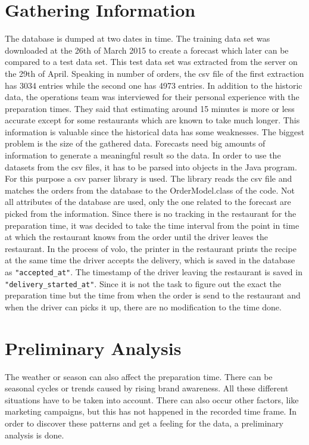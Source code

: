 \section{Gathering Information}\label{section:Gathering Information}
The database is dumped at two dates in time. The training data set was downloaded at the 26th of March 2015 to create a forecast which later can be compared to a test data set. This test data set was extracted from the server on the 29th of April. Speaking in number of orders, the csv file of the first extraction has 3034 entries while the second one has 4973 entries. In addition to the historic data, the operations team was interviewed for their personal experience with the preparation times. They said that estimating around 15 minutes is more or less accurate except for some restaurants which are known to take much longer.\newline
This information is valuable since the historical data has some weaknesses. The biggest problem is the size of the gathered data. Forecasts need big amounts of information to generate a meaningful result so the data.\newline
In order to use the datasets from the csv files, it has to be parsed into objects in the Java program. For this purpose a csv parser library is used. The library reads the csv file and matches the orders from the database to the OrderModel.class of the code. Not all attributes of the database are used, only the one related to the forecast are picked from the information. Since there is no tracking in the restaurant for the preparation time, it was decided to take the time interval from the point in time at which the restaurant knows from the order until the driver leaves the restaurant. In the process of volo, the printer in the restaurant prints the recipe at the same time the driver accepts the delivery, which is saved in the database as \texttt{"accepted\_at"}. The timestamp of the driver leaving the restaurant is saved in \texttt{"delivery\_started\_at"}. Since it is not the task to figure out the exact the preparation time but the time from when the order is send to the restaurant and when the driver can picks it up, there are no modification to the time done.
\section{Preliminary Analysis}\label{section:Preliminary Analysis}
The weather or season can also affect the preparation time. There can be seasonal cycles or trends caused by rising brand awareness. All these different situations have to be taken into account. There can also occur other factors, like marketing campaigns, but this has not happened in the recorded time frame. In order to discover these patterns and get a feeling for the data, a preliminary analysis is done.

